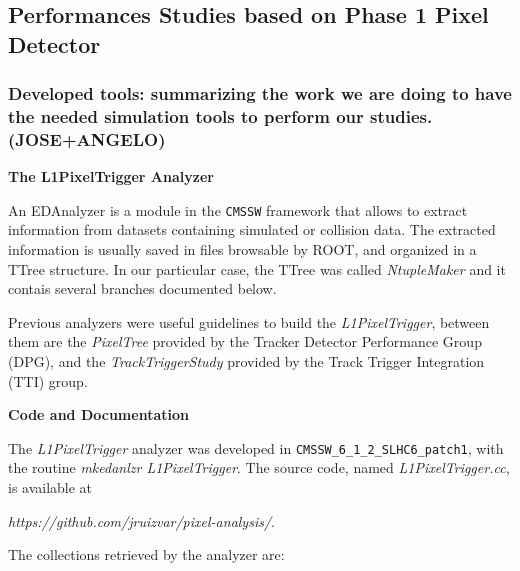 \subsection{Performances Studies based on Phase 1 Pixel Detector}

\subsubsection{Developed tools: summarizing the work we are doing to have the needed simulation tools to perform our studies. (JOSE+ANGELO)}

\textbf{The L1PixelTrigger Analyzer}

An EDAnalyzer is a module in the \texttt{CMSSW} framework that allows to extract information from datasets
containing simulated or collision data. The extracted information is usually saved in files browsable by ROOT,
and organized in a TTree structure. In our particular case, the TTree was called \textit{NtupleMaker} and it
contais several branches documented below.

Previous analyzers were useful guidelines to build the \textit{L1PixelTrigger}, between them are the
\textit{PixelTree} provided by the Tracker Detector Performance Group (DPG), and the \textit{TrackTriggerStudy}
provided by the Track Trigger Integration (TTI) group.

\textbf{Code and Documentation}

The \textit{L1PixelTrigger} analyzer was developed in \texttt{CMSSW\_6\_1\_2\_SLHC6\_patch1}, with the routine
{\it mkedanlzr L1PixelTrigger}. The source code, named {\it L1PixelTrigger.cc}, is available at

{\it https://github.com/jruizvar/pixel-analysis/}. 

The collections retrieved by the analyzer are:

